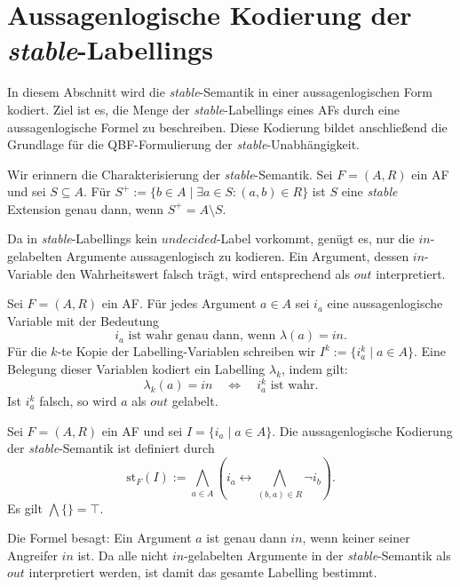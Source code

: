 \section{Aussagenlogische Kodierung der \textit{stable}-Labellings}
\label{sec:st-pl}

In diesem Abschnitt wird die \textit{stable}-Semantik in einer
aussagenlogischen Form kodiert. Ziel ist es, die Menge der
\textit{stable}-Labellings eines AFs durch eine aussagenlogische Formel zu
beschreiben. Diese Kodierung bildet anschließend die Grundlage für die
QBF-Formulierung der \textit{stable}-Unabhängigkeit.

Wir erinnern die Charakterisierung der \textit{stable}-Semantik.
Sei \(F=(A,R)\) ein AF und sei \(S\subseteq A\). Für \(S^+ := \{b\in A \mid \exists a\in S : (a,b)\in R\}\)
ist \(S\) eine \textit{stable} Extension genau dann, wenn \(S^+ = A\setminus S.\)

Da in \textit{stable}-Labellings kein \(\mathit{undecided}\)-Label
vorkommt, genügt es, nur die \(\mathit{in}\)-gelabelten Argumente
aussagenlogisch zu kodieren. Ein Argument, dessen \(in\)-Variable den Wahrheitswert falsch
trägt, wird entsprechend als \(\mathit{out}\) interpretiert.

\begin{Definition}
    \label{def:in-vars}
    Sei \(F=(A,R)\) ein AF. Für jedes Argument \(a\in A\) sei \(i_a\)
    eine aussagenlogische Variable mit der Bedeutung
    \[
        i_a \text{ ist wahr genau dann, wenn } \lambda(a)=\mathit{in}.
    \]
    Für die \(k\)-te Kopie der Labelling-Variablen schreiben wir \( I^k := \{i_a^k \mid a\in A\}.\)
    Eine Belegung dieser Variablen kodiert ein Labelling \(\lambda_k\),
    indem gilt:
    \[
        \lambda_k(a)=\mathit{in}
        \quad\Longleftrightarrow\quad
        i_a^k \text{ ist wahr}.
    \]
    Ist \(i_a^k\) falsch, so wird \(a\) als \(\mathit{out}\) gelabelt.
\end{Definition}

\begin{Definition}
    \label{def:st-pl}
    Sei \(F=(A,R)\) ein AF und sei \(I = \{i_a \mid a\in A\}.\)
    Die aussagenlogische Kodierung der
    \textit{stable}-Semantik ist definiert durch
    \[
        \mathrm{st}_F(I)
        :=
        \bigwedge_{a\in A}
        (
            i_a
            \leftrightarrow
            \bigwedge_{(b,a)\in R} \neg i_b
        ).
    \]
    Es gilt \( \bigwedge \{\} = \top.\)
\end{Definition}

Die Formel besagt: Ein Argument \(a\) ist genau dann \(\mathit{in}\),
wenn keiner seiner Angreifer \(\mathit{in}\) ist. Da alle nicht
\(\mathit{in}\)-gelabelten Argumente in der \textit{stable}-Semantik als
\(\mathit{out}\) interpretiert werden, ist damit das gesamte Labelling
bestimmt.

